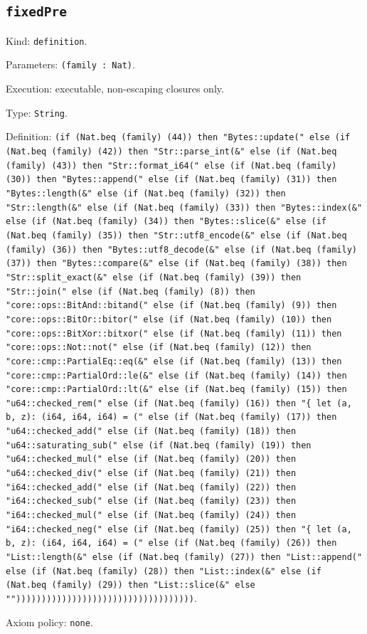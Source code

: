 \documentclass[11pt]{article}
\begin{document}
\subsection*{\texttt{fixedPre}}
\noindent Kind: \texttt{definition}.\par
\noindent Parameters: \texttt{(family : Nat)}.\par
\noindent Execution: executable, non-escaping closures only.\par
\noindent Type: \texttt{String}.\par
\noindent Definition: \texttt{(if (Nat.beq (family) (44)) then "Bytes::update(" else (if (Nat.beq (family) (42)) then "Str::parse\_int(\&" else (if (Nat.beq (family) (43)) then "Str::format\_i64(" else (if (Nat.beq (family) (30)) then "Bytes::append(" else (if (Nat.beq (family) (31)) then "Bytes::length(\&" else (if (Nat.beq (family) (32)) then "Str::length(\&" else (if (Nat.beq (family) (33)) then "Bytes::index(\&" else (if (Nat.beq (family) (34)) then "Bytes::slice(\&" else (if (Nat.beq (family) (35)) then "Str::utf8\_encode(\&" else (if (Nat.beq (family) (36)) then "Bytes::utf8\_decode(\&" else (if (Nat.beq (family) (37)) then "Bytes::compare(\&" else (if (Nat.beq (family) (38)) then "Str::split\_exact(\&" else (if (Nat.beq (family) (39)) then "Str::join(" else (if (Nat.beq (family) (8)) then "core::ops::BitAnd::bitand(" else (if (Nat.beq (family) (9)) then "core::ops::BitOr::bitor(" else (if (Nat.beq (family) (10)) then "core::ops::BitXor::bitxor(" else (if (Nat.beq (family) (11)) then "core::ops::Not::not(" else (if (Nat.beq (family) (12)) then "core::cmp::PartialEq::eq(\&" else (if (Nat.beq (family) (13)) then "core::cmp::PartialOrd::le(\&" else (if (Nat.beq (family) (14)) then "core::cmp::PartialOrd::lt(\&" else (if (Nat.beq (family) (15)) then "u64::checked\_rem(" else (if (Nat.beq (family) (16)) then "\{ let (a, b, z): (i64, i64, i64) = (" else (if (Nat.beq (family) (17)) then "u64::checked\_add(" else (if (Nat.beq (family) (18)) then "u64::saturating\_sub(" else (if (Nat.beq (family) (19)) then "u64::checked\_mul(" else (if (Nat.beq (family) (20)) then "u64::checked\_div(" else (if (Nat.beq (family) (21)) then "i64::checked\_add(" else (if (Nat.beq (family) (22)) then "i64::checked\_sub(" else (if (Nat.beq (family) (23)) then "i64::checked\_mul(" else (if (Nat.beq (family) (24)) then "i64::checked\_neg(" else (if (Nat.beq (family) (25)) then "\{ let (a, b, z): (i64, i64, i64) = (" else (if (Nat.beq (family) (26)) then "List::length(\&" else (if (Nat.beq (family) (27)) then "List::append(" else (if (Nat.beq (family) (28)) then "List::index(\&" else (if (Nat.beq (family) (29)) then "List::slice(\&" else "")))))))))))))))))))))))))))))))))))}.\par
\noindent Axiom policy: \texttt{none}.\par
\end{document}
